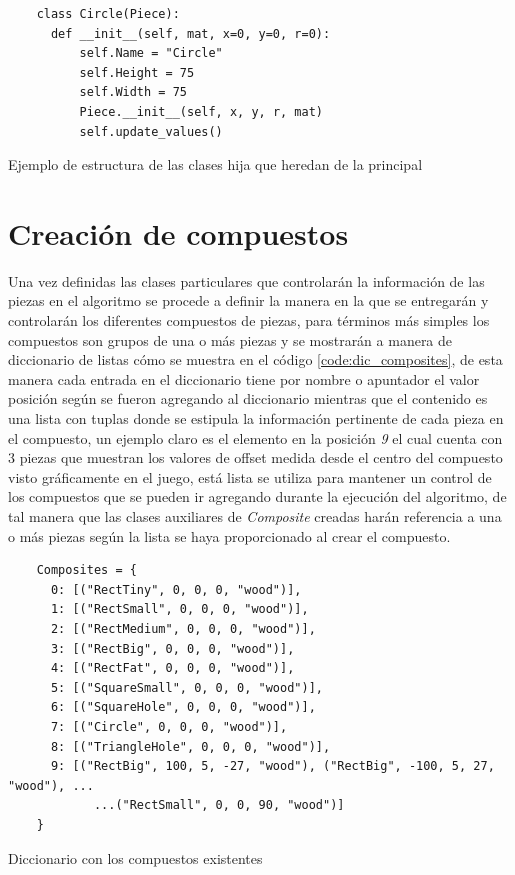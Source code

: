 \begin{listing}[ht]
  \begin{verbatim}
    class Circle(Piece):
      def __init__(self, mat, x=0, y=0, r=0):
          self.Name = "Circle"
          self.Height = 75
          self.Width = 75
          Piece.__init__(self, x, y, r, mat)
          self.update_values()
  \end{verbatim}
  \caption{Ejemplo de estructura de las clases hija que heredan de la principal}
  \label{code:dic_individual_piece}
\end{listing}

\section{Creación de compuestos}
\label{section:composite_creation}

Una vez definidas las clases particulares que controlarán la información de las
piezas en el algoritmo se procede a definir la manera en la que se entregarán y
controlarán los diferentes compuestos de piezas, para términos más simples los
compuestos son grupos de una o más piezas y se mostrarán a manera de diccionario
de listas cómo se muestra en el código \ref{code:dic_composites}, de esta manera
cada entrada en el diccionario tiene por nombre o apuntador el valor posición
según se fueron agregando al diccionario mientras que el contenido es una lista
con tuplas donde se estipula la información pertinente de cada pieza en el
compuesto, un ejemplo claro es el elemento en la posición \textit{9} el cual
cuenta con 3 piezas que muestran los valores de offset medida desde el centro
del compuesto visto gráficamente en el juego, está lista se utiliza para
mantener un control de los compuestos que se pueden ir agregando durante la
ejecución del algoritmo, de tal manera que las clases auxiliares de
\textit{Composite} creadas harán referencia a una o más piezas según la lista se
haya proporcionado al crear el compuesto.

\begin{listing}[ht]
  \begin{verbatim}
    Composites = {
      0: [("RectTiny", 0, 0, 0, "wood")],
      1: [("RectSmall", 0, 0, 0, "wood")],
      2: [("RectMedium", 0, 0, 0, "wood")],
      3: [("RectBig", 0, 0, 0, "wood")],
      4: [("RectFat", 0, 0, 0, "wood")],
      5: [("SquareSmall", 0, 0, 0, "wood")],
      6: [("SquareHole", 0, 0, 0, "wood")],
      7: [("Circle", 0, 0, 0, "wood")],
      8: [("TriangleHole", 0, 0, 0, "wood")],
      9: [("RectBig", 100, 5, -27, "wood"), ("RectBig", -100, 5, 27, "wood"), ...
            ...("RectSmall", 0, 0, 90, "wood")]
    } 
  \end{verbatim}
  \caption{Diccionario con los compuestos existentes}
  \label{code:dic_composites}
\end{listing}

